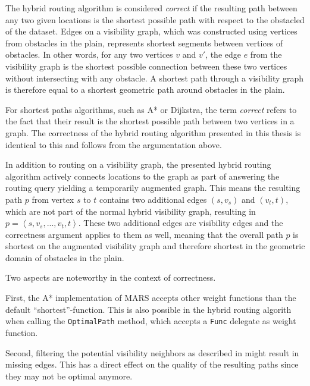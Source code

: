 		The hybrid routing algorithm is considered \emph{correct} if the resulting path between any two given locations is the shortest possible path with respect to the obstacled of the dataset.
		Edges on a visibility graph, which was constructed using vertices from obstacles in the plain, represents shortest segments between vertices of obstacles.
		In other words, for any two vertices $v$ and $v'$, the edge $e$ from the visibility graph is the shortest possible connection between these two vertices without intersecting with any obstacle.
		A shortest path through a visibility graph is therefore equal to a shortest geometric path around obstacles in the plain.
		
		For shortest paths algorithms, such as A* or Dijkstra, the term \emph{correct} refers to the fact that their result is the shortest possible path between two vertices in a graph.
		The correctness of the hybrid routing algorithm presented in this thesis is identical to this and follows from the argumentation above.
		
		In addition to routing on a visibility graph, the presented hybrid routing algorithm actively connects locations to the graph as part of answering the routing query yielding a temporarily augmented graph.
		This means the resulting path $p$ from vertex $s$ to $t$ contains two additional edges $(s, v_s)$ and $(v_t, t)$, which are not part of the normal hybrid visibility graph, resulting in $p=\left\langle s, v_s, ..., v_t, t \right\rangle$.
		These two additional edges are visibility edges and the correctness argument applies to them as well, meaning that the overall path $p$ is shortest on the augmented visibility graph and therefore shortest in the geometric domain of obstacles in the plain.
		
		Two aspects are noteworthy in the context of correctness.
		
		First, the A* implementation of MARS accepts other weight functions than the default \enquote{shortest}-function.
		This is also possible in the hybrid routing algorith when calling the \texttt{OptimalPath} method, which accepts a \texttt{Func} delegate as weight function.
		
		Second, filtering the potential visibility neighbors as described in  might result in missing edges.
		This has a direct effect on the quality of the resulting paths since they may not be optimal anymore.
		
